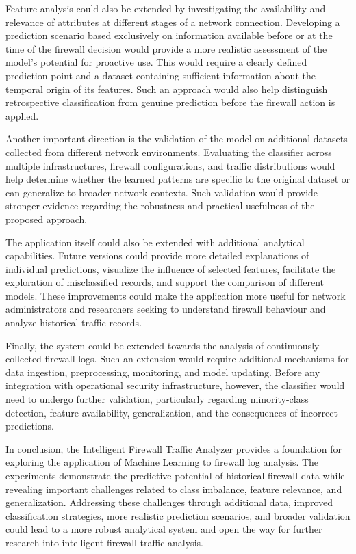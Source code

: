 Feature analysis could also be extended by investigating the availability and relevance of attributes at different stages of a network connection. Developing a prediction scenario based exclusively on information available before or at the time of the firewall decision would provide a more realistic assessment of the model's potential for proactive use. This would require a clearly defined prediction point and a dataset containing sufficient information about the temporal origin of its features. Such an approach would also help distinguish retrospective classification from genuine prediction before the firewall action is applied.

Another important direction is the validation of the model on additional datasets collected from different network environments. Evaluating the classifier across multiple infrastructures, firewall configurations, and traffic distributions would help determine whether the learned patterns are specific to the original dataset or can generalize to broader network contexts. Such validation would provide stronger evidence regarding the robustness and practical usefulness of the proposed approach.

The application itself could also be extended with additional analytical capabilities. Future versions could provide more detailed explanations of individual predictions, visualize the influence of selected features, facilitate the exploration of misclassified records, and support the comparison of different models. These improvements could make the application more useful for network administrators and researchers seeking to understand firewall behaviour and analyze historical traffic records.

Finally, the system could be extended towards the analysis of continuously collected firewall logs. Such an extension would require additional mechanisms for data ingestion, preprocessing, monitoring, and model updating. Before any integration with operational security infrastructure, however, the classifier would need to undergo further validation, particularly regarding minority-class detection, feature availability, generalization, and the consequences of incorrect predictions.


In conclusion, the Intelligent Firewall Traffic Analyzer provides a foundation for exploring the application of Machine Learning to firewall log analysis. The experiments demonstrate the predictive potential of historical firewall data while revealing important challenges related to class imbalance, feature relevance, and generalization. Addressing these challenges through additional data, improved classification strategies, more realistic prediction scenarios, and broader validation could lead to a more robust analytical system and open the way for further research into intelligent firewall traffic analysis.



















